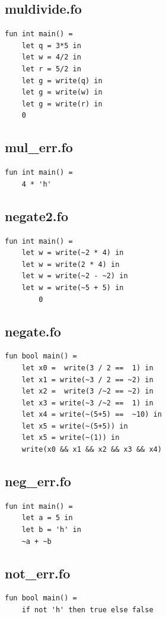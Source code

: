 \documentclass[11pt]{article}
\begin{document}
    \subsection{muldivide.fo}
    \begin{lstlisting}
fun int main() =
    let q = 3*5 in
    let w = 4/2 in
    let r = 5/2 in
    let g = write(q) in
    let g = write(w) in
    let g = write(r) in
    0
    \end{lstlisting}

    \subsection{mul\_err.fo}
    \begin{lstlisting}
fun int main() =
    4 * 'h'
    \end{lstlisting}

    \subsection{negate2.fo}
    \begin{lstlisting}
fun int main() =
    let w = write(~2 * 4) in
    let w = write(2 * 4) in
    let w = write(~2 - ~2) in
    let w = write(~5 + 5) in
        0
    \end{lstlisting}

    \subsection{negate.fo}
    \begin{lstlisting}
fun bool main() =
    let x0 =  write(3 / 2 ==  1) in
    let x1 = write(~3 / 2 == ~2) in
    let x2 =  write(3 /~2 == ~2) in
    let x3 = write(~3 /~2 ==  1) in
    let x4 = write(~(5+5) ==  ~10) in
    let x5 = write(~(5+5)) in
    let x5 = write(~(1)) in
    write(x0 && x1 && x2 && x3 && x4)
    \end{lstlisting}

    \subsection{neg\_err.fo}
    \begin{lstlisting}[basicstyle=\small]
fun int main() =
    let a = 5 in
    let b = 'h' in
    ~a + ~b
    \end{lstlisting}

    \subsection{not\_err.fo}
    \begin{lstlisting}[basicstyle=\small]
fun bool main() =
    if not 'h' then true else false
    \end{lstlisting}
\end{document}

